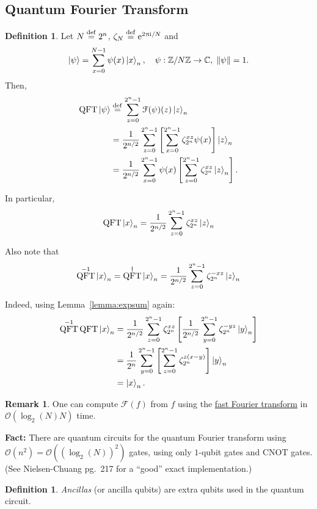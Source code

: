 \documentclass[12pt]{amsart}
\theoremstyle{plain}
\theoremstyle{definition}
\newtheorem{definition}[theorem]{Definition}
\theoremstyle{remarks}
\newtheorem*{remark}{Remark}
\newcommand{\mcal}{\mathcal}
\newcommand{\Z}{\mathbb{Z}}
\newcommand{\C}{\mathbb{C}}
\newcommand{\me}{\mathrm{e}}
\newcommand{\mi}{\mathrm{i}}
\newcommand{\mpi}{\uppi}
\newcommand{\idef}{\overset{{\rm def}}{=}}
\newcommand{\cnot}{\mathrm{CNOT}}  %
\newcommand{\adj}[1]{#1^{\dagger}}  %
\newcommand{\ft}{\mathcal{F}}  %
\DeclareMathOperator{\qft}{QFT}  %
\begin{document}
\subsection{Quantum Fourier Transform}

\begin{definition}
  Let $N \idef 2^n$, $\zeta_N \idef \me^{2 \mpi \mi/ N}$ and
  \[
    \ket{\psi} = \sum_{x=0}^{N-1} \psi(x) \ket{x}_n, \quad \psi : \Z/{N}\Z \to \C, \; \left\| \psi \right\| = 1.
  \]
  Then,
  \begin{align*}
    \qft \ket{\psi}
    &\idef \sum_{z=0}^{2^n-1}\ft(\psi)(z) \ket{z}_n \\
    &= \frac{1}{2^{n/2}}  \sum_{z=0}^{2^n - 1}\left[ \sum_{x=0}^{2^n-1} \zeta_{2^n}^{xz} \psi(x)\right] \ket{z}_n \\
    &= \frac{1}{2^{n/2}}  \sum_{x=0}^{2^n - 1} \psi(x) \left[ \sum_{z=0}^{2^n-1} \zeta_{2^n}^{xz} \ket{z}_n \right].
  \end{align*}
\end{definition}


In particular,
\[
  \qft \ket{x}_n = \frac{1}{2^{n/2}} \sum_{z=0}^{2^n-1} \zeta_{2^n}^{xz} \ket{z}_n
\]

Also note that
\[
  \qft^{-1} \ket{x}_n = \adj{\qft} \ket{x}_n = \frac{1}{2^{n/2}} \sum_{z=0}^{2^n-1} \zeta_{2^n}^{-xz} \ket{z}_n
\]

Indeed, using Lemma~\ref{lemma:expsum} again:
\begin{align*}
  \qft^{-1} \qft \ket{x}_n
  &=  \frac{1}{2^{n/2}} \sum_{z=0}^{2^n-1} \zeta_{2^n}^{xz} \left[  \frac{1}{2^{n/2}} \sum_{y=0}^{2^n-1} \zeta_{2^n}^{-yz} \ket{y}_n \right] \\
  &= \frac{1}{2^n} \sum_{y=0}^{2^n-1} \left[ \sum_{z=0}^{2^n - 1} \zeta_{2^n}^{z(x-y)}\right] \ket{y}_n \\
  &= \ket{x}_n.
\end{align*}

\begin{remark}
  One can compute $\ft(f)$ from $f$ using the \href{https://en.wikipedia.org/wiki/Fast_Fourier_transform}{fast Fourier transform} in $\mcal{O}(\log_2(N) N)$ time.
\end{remark}

\textbf{Fact:} There are quantum circuits for the quantum Fourier transform using $\mcal{O}(n^2) = \mcal{O}({(\log_2(N))}^2)$ gates, using only $1$-qubit gates and $\cnot$ gates.  (See Nielsen-Chuang pg.~217 for a ``good'' exact implementation.)


\begin{definition}
  \emph{Ancillas} (or ancilla qubits) are extra qubits used in the quantum circuit.
\end{definition}
\end{document}
